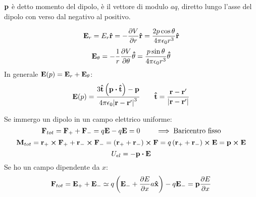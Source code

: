 \documentclass[12pt,a4paper]{article}
\begin{document}
\begin{definition}
    $\vb{p}$ è detto momento del dipolo, è il vettore di modulo $aq$, diretto lungo l'asse del dipolo con verso dal negativo al positivo.

\end{definition}

\begin{equation*}
    \vb{E}_r=E_r\vu{r}=-\pdv{V}{r}\vu{r}= \frac{2 p \cos \theta}{4\pi\epsilon_0r^3}\vu{r}
\end{equation*}
\begin{equation*}
    \vb{E}_\theta = -\frac{1}{r}\pdv{V}{\theta}\vu{\theta}= \frac{p \sin \theta}{4\pi\epsilon_0r^3}\vu{\theta}
\end{equation*}
In generale $\vb{E}(p)=\vb{E}_r+\vb{E}_\theta$:
\begin{equation*}
    \vb{E}(p)=\frac{3\vu{t}\left( \vb{p}\vdot\vu{t} \right)-\vb{p}}{4\pi\epsilon_0\abs{\vb{r}-\vb{r}'}^3} \quad \quad 
    \vu{t} = \frac{\vb{r}-\vb{r}'}{\abs{\vb{r}-\vb{r}'}}
\end{equation*}

Se immergo un dipolo in un campo elettrico uniforme:
\begin{equation*}
    \vb{F}_{tot} = \vb{F}_+ +\vb{F}_-= q\vb{E}-q\vb{E}=0  \quad \quad \implies \text{Baricentro fisso}
\end{equation*}
\begin{equation*}
    \vb{M}_{tot}= \vb{r}_+\cp\vb{F}_+ + \vb{r}_-\cp\vb{F}_-=\left( \vb{r}_++\vb{r}_- \right) \cp\vb{F}=
     q\left( \vb{r}_++\vb{r}_- \right) \cp\vb{E}= \vb{p}\cp\vb{E}
\end{equation*}
\begin{equation*}
    U_{el}= -\vb{p}\vdot\vb{E}
\end{equation*}
Se ho un campo dipendente da $x$:
\begin{equation*}
    \vb{F}_{tot} = \vb{E}_+ +\vb{E}_-\simeq q\left( \vb{E}_- + \pdv{E}{x}a\vu{x} \right)-q\vb{E}_-= \vb{p}\pdv{E}{x}
\end{equation*}
\end{document}
